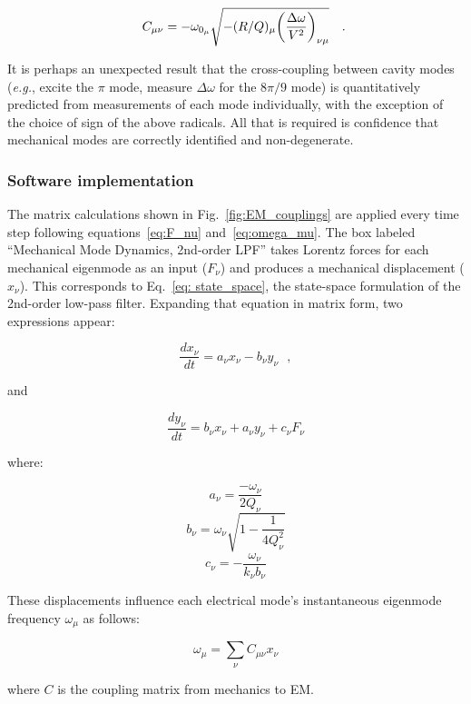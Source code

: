 \documentclass[a4paper,12pt]{article}
\newcommand{\be}{\begin{equation}}
\newcommand{\ee}{\end{equation}}
\begin{document}
\begin{equation}
 C_{\mu\nu} = -\omega_{0_{\mu}} \sqrt{-(R/Q)_{\mu}{ \left(\frac{\Delta \omega}{ V^2}\right)_{\nu \mu}}}\rlap{~~~.}
\end{equation}

It is perhaps an unexpected result that the cross-coupling between cavity modes ({\it e.g.}, excite the $\pi$ mode, measure $\Delta\omega$ for the $8\pi/9$ mode) is quantitatively predicted from measurements of each mode individually, with the exception of the choice of sign of the above radicals.  All that is required is confidence that mechanical modes are correctly identified and non-degenerate.

\subsubsection{Software implementation}


The matrix calculations shown in Fig.~\ref{fig:EM_couplings} are applied every time step following equations~\ref{eq:F_nu} and~\ref{eq:omega_mu}. The box labeled ``Mechanical Mode Dynamics, 2nd-order LPF'' takes Lorentz forces for each mechanical eigenmode as an input ($F_{\nu}$) and produces a mechanical displacement ($x_{\nu}$). This corresponds to Eq.~\ref{eq: state_space}, the state-space formulation of the 2nd-order low-pass filter. Expanding that equation in matrix form, two expressions appear:

\begin{equation}
  \frac{dx_{\nu}}{dt} = a_{\nu}x_{\nu} - b_{\nu}y_{\nu}~~~,
  \label{eq:dx/dt}
\end{equation}

\noindent and

\begin{equation}
  \frac{dy_{\nu}}{dt} = b_{\nu}x_{\nu} + a_{\nu}y_{\nu} + c_{\nu}F_{\nu}
  \label{eq:dy/dt}
\end{equation}

\noindent where:

\be
a_{\nu} =  \frac{-\omega_{\nu}}{2Q_{\nu}}
\ee
\be
b_{\nu} = \omega_{\nu} \sqrt{1 - \frac{1}{4Q_{\nu}^{2}}}
\ee
\be
c_{\nu} = -\frac{\omega_{\nu}}{k_{\nu}b_{\nu}}
\ee

These displacements influence each electrical mode's instantaneous eigenmode frequency $\omega_{\mu}$ as follows:

\be
\omega_\mu = \sum_\nu C_{\mu\nu} x_\nu
\label{eq:sum_w_mu}
\ee

\noindent where $C$ is the coupling matrix from mechanics to EM.
\end{document}
